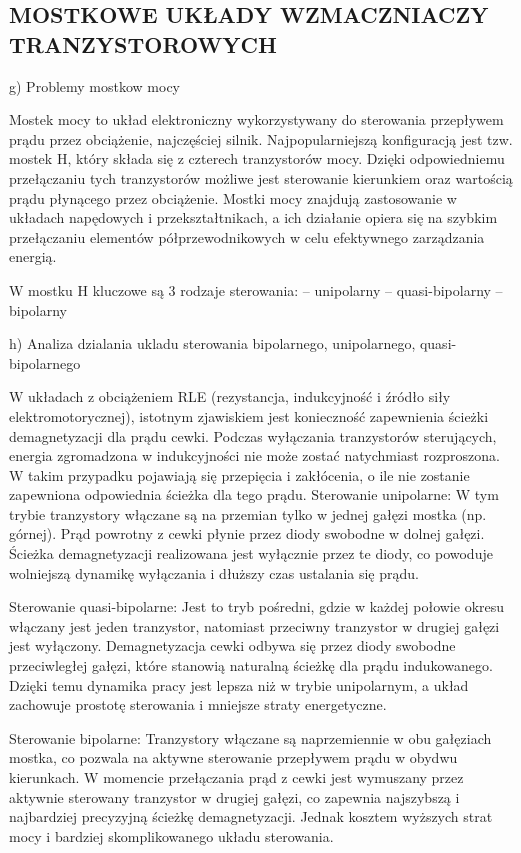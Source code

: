 \documentclass[11pt]{article}
\begin{document}
\subsection{MOSTKOWE UKŁADY WZMACZNIACZY TRANZYSTOROWYCH}

g) Problemy mostkow mocy

Mostek mocy to układ elektroniczny wykorzystywany do sterowania przepływem prądu przez obciążenie, najczęściej silnik. Najpopularniejszą konfiguracją jest tzw. mostek H, który składa się z czterech tranzystorów mocy. Dzięki odpowiedniemu przełączaniu tych tranzystorów możliwe jest sterowanie kierunkiem oraz wartością prądu płynącego przez obciążenie. Mostki mocy znajdują zastosowanie w układach napędowych i przekształtnikach, a ich działanie opiera się na szybkim przełączaniu elementów półprzewodnikowych w celu efektywnego zarządzania energią.

W mostku H kluczowe są 3 rodzaje sterowania:
-- unipolarny
-- quasi-bipolarny
-- bipolarny

h) Analiza dzialania ukladu sterowania bipolarnego, unipolarnego, quasi-bipolarnego

W układach z obciążeniem RLE (rezystancja, indukcyjność i źródło siły elektromotorycznej), istotnym zjawiskiem jest konieczność zapewnienia ścieżki demagnetyzacji dla prądu cewki. Podczas wyłączania tranzystorów sterujących, energia zgromadzona w indukcyjności nie może zostać natychmiast rozproszona. W takim przypadku pojawiają się przepięcia i zakłócenia, o ile nie zostanie zapewniona odpowiednia ścieżka dla tego prądu.
Sterowanie unipolarne:
 W tym trybie tranzystory włączane są na przemian tylko w jednej gałęzi mostka (np. górnej). Prąd powrotny z cewki płynie przez diody swobodne w dolnej gałęzi. Ścieżka demagnetyzacji realizowana jest wyłącznie przez te diody, co powoduje wolniejszą dynamikę wyłączania i dłuższy czas ustalania się prądu.

Sterowanie quasi-bipolarne:
Jest to tryb pośredni, gdzie w każdej połowie okresu włączany jest jeden tranzystor, natomiast przeciwny tranzystor w drugiej gałęzi jest wyłączony. Demagnetyzacja cewki odbywa się przez diody swobodne przeciwległej gałęzi, które stanowią naturalną ścieżkę dla prądu indukowanego. Dzięki temu dynamika pracy jest lepsza niż w trybie unipolarnym, a układ zachowuje prostotę sterowania i mniejsze straty energetyczne.

Sterowanie bipolarne:
Tranzystory włączane są naprzemiennie w obu gałęziach mostka, co pozwala na aktywne sterowanie przepływem prądu w obydwu kierunkach. W momencie przełączania prąd z cewki jest wymuszany przez aktywnie sterowany tranzystor w drugiej gałęzi, co zapewnia najszybszą i najbardziej precyzyjną ścieżkę demagnetyzacji. Jednak kosztem wyższych strat mocy i bardziej skomplikowanego układu sterowania.
\end{document}
